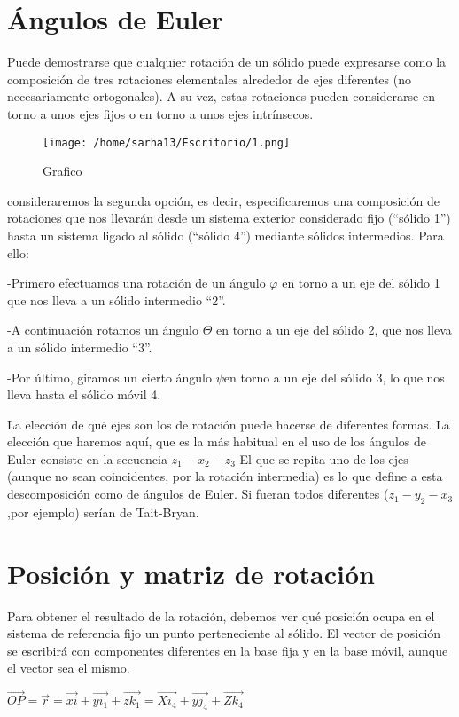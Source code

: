 \documentclass[12pt,a4paper]{report}
\begin{document}
\section{Ángulos de Euler}
Puede demostrarse que cualquier rotación de un sólido puede expresarse como la composición de tres rotaciones elementales alrededor de ejes diferentes (no necesariamente ortogonales). A su vez, estas rotaciones pueden considerarse en torno a unos ejes fijos o en torno a unos ejes intrínsecos.

\begin{figure}[htp]
\centering
\texttt{[image: /home/sarha13/Escritorio/1.png]}
\caption{Grafico}
\label{Figura 1.}
\end{figure}

consideraremos la segunda opción, es decir, especificaremos una composición de rotaciones que nos llevarán desde un sistema exterior considerado fijo (“sólido 1”) hasta un sistema ligado al sólido (“sólido 4”) mediante sólidos intermedios. Para ello:

-Primero efectuamos una rotación de un ángulo $\varphi$ en torno a un eje del sólido 1 que nos lleva a un sólido intermedio “2”.

-A continuación rotamos un ángulo $\Theta$ en torno a un eje del sólido 2, que nos lleva a un sólido intermedio “3”.

-Por último, giramos un cierto ángulo $\psi$en torno a un eje del sólido 3, lo que nos lleva hasta el sólido móvil 4.

La elección de qué ejes son los de rotación puede hacerse de diferentes formas. La elección que haremos aquí, que es la más habitual en el uso de los ángulos de Euler consiste en la secuencia $z_{1}-x_{2}-z_{3}$ El que se repita uno de los ejes (aunque no sean coincidentes, por la rotación intermedia) es lo que define a esta descomposición como de ángulos de Euler. Si fueran todos diferentes ($z_{1}-y_{2}-x_{3}$,por ejemplo) serían de Tait-Bryan.

\section{Posición y matriz de rotación}
Para obtener el resultado de la rotación, debemos ver qué posición ocupa en el sistema de referencia fijo un punto perteneciente al sólido. El vector de posición se escribirá con componentes diferentes en la base fija y en la base móvil, aunque el vector sea el mismo.
\begin{center}
$\overrightarrow{OP}=\overrightarrow{r}=\overrightarrow{xi}+\overrightarrow{yi_{1}}+\overrightarrow{zk_{1}}=\overrightarrow{Xi_{4}}+\overrightarrow{yj_{4}}+\overrightarrow{Zk_{4}}$
\end{center}
\end{document}
